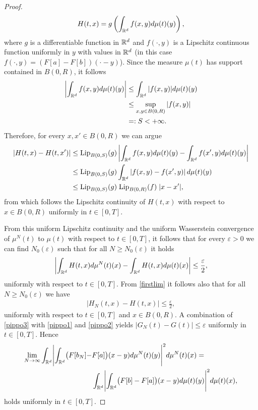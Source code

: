 \begin{proof}
\begin{align*}
	H(t,x) = g\left(\int_{\mathbb{R}^d} f(x,y) d\mu(t)(y)\right),
	\end{align*}
	where $g$ is a differentiable function in $\mathbb{R}^d$ and $f(\cdot,y)$ is a Lipschitz continuous function uniformly in $y$ with values in $\mathbb{R}^d$ (in this case $f(\cdot,y)=(F[a] -F[ b])(\cdot -y)$). Since the measure $\mu(t)$ has support contained in $B(0,R)$, it follows
	\begin{align*}
	\left|\int_{\mathbb{R}^d} f(x,y) d\mu(t)(y)\right| &\leq \int_{\mathbb{R}^d} |f(x,y)| d\mu(t)(y) \\
	& \leq \sup_{x,y \in B(0,R)} |f(x,y)|\\
	& =: S <+\infty.
	\end{align*}
	Therefore, for every $x, x' \in B(0,R)$ we can argue
	\begin{align*}
	\left|H(t,x)-H(t,x')\right| &\leq \textup{Lip}_{B(0,S)} (g) \left|\int_{\mathbb{R}^d} f(x,y) d\mu(t)(y) - \int_{\mathbb{R}^d} f(x',y) d\mu(t)(y)\right| \\
	&\leq \textup{Lip}_{B(0,S)} (g) \int_{\mathbb{R}^d} \left|f(x,y)  - f(x',y)\right|  d\mu(t)(y)\\
	&\leq \textup{Lip}_{B(0,S)} (g) \; \textup{Lip}_{B(0,R)} (f) \; |x-x'|,
	\end{align*}
	from which follows the Lipschitz continuity of $H(t,x)$ with respect to $x \in B(0,R)$ uniformly in $t \in [0,T]$.
	
	From this uniform Lipschitz continuity and the uniform Wasserstein convergence of $\mu^N(t)$ to $\mu(t)$ with respect to $t \in [0,T]$, it follows that for every $\varepsilon > 0$ we can find $N_0(\varepsilon)$ such that for all $N \geq N_0(\varepsilon)$ it holds
	\begin{align}\label{pippo1}
		\left|\int_{\mathbb{R}^d}H(t,x)d\mu^N(t)(x) - \int_{\mathbb{R}^d}H(t,x)d\mu(t)(x)\right|\leq \frac{\varepsilon}{2},
	\end{align}
	uniformly with respect to $t \in [0,T]$. From \eqref{firstlim} it follows also that for all $N \geq N_0(\varepsilon)$ we have
	\begin{align}\label{pippo2}
	\left|H_N(t,x) - H(t,x)\right| \leq \frac{\varepsilon}{2},
	\end{align}
	uniformly with respect to $t \in [0,T]$ and $x \in B(0,R)$. A combination of \eqref{pippo3} with \eqref{pippo1} and \eqref{pippo2}  yields $|G_N(t)-G(t)| \leq \varepsilon$ uniformly in $t \in [0,T]$. Hence
	\begin{align*}
		\lim_{N\rightarrow\infty}
			\int_{\mathbb{R}^d}\Biggl|\int_{\mathbb{R}^d}\bigl(F[ b_{N}]-&F[a]\bigr)(x-y)d\mu^{N}(t)(y)\Biggr|^2d\mu^N(t)(x) = \\
			&\int_{\mathbb{R}^d}\Biggl|\int_{\mathbb{R}^d}\bigl(F[ b]-F[a]\bigr)(x-y)d\mu(t)(y)\Biggr|^2d\mu(t)(x),
	\end{align*}
	 holds uniformly in $t \in [0,T]$.
	

\end{proof}
